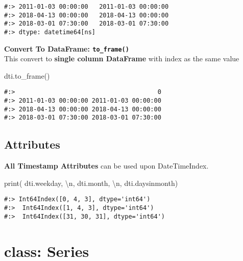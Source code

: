 \documentclass[
]{book}
\newenvironment{Shaded}{\begin{snugshade}}{\end{snugshade}}
\newcommand{\BuiltInTok}[1]{#1}
\newcommand{\CharTok}[1]{\textcolor[rgb]{0.5,0.5,0.5}{#1}}
\newcommand{\NormalTok}[1]{#1}
\newcommand{\StringTok}[1]{\textcolor[rgb]{0.5,0.5,0.5}{#1}}
\begin{document}
\begin{verbatim}
#:> 2011-01-03 00:00:00   2011-01-03 00:00:00
#:> 2018-04-13 00:00:00   2018-04-13 00:00:00
#:> 2018-03-01 07:30:00   2018-03-01 07:30:00
#:> dtype: datetime64[ns]
\end{verbatim}

\textbf{Convert To DataFrame: \texttt{to\_frame()}}\\
This convert to \textbf{single column DataFrame} with index as the same value

\begin{Shaded}
\begin{Highlighting}[]
\NormalTok{dti.to\_frame()}
\end{Highlighting}
\end{Shaded}

\begin{verbatim}
#:>                                       0
#:> 2011-01-03 00:00:00 2011-01-03 00:00:00
#:> 2018-04-13 00:00:00 2018-04-13 00:00:00
#:> 2018-03-01 07:30:00 2018-03-01 07:30:00
\end{verbatim}

\hypertarget{attributes-5}{%
\subsection{Attributes}\label{attributes-5}}

\textbf{All Timestamp Attributes} can be used upon DateTimeIndex.

\begin{Shaded}
\begin{Highlighting}[]
\BuiltInTok{print}\NormalTok{( dti.weekday, }\StringTok{\textquotesingle{}}\CharTok{\textbackslash{}n}\StringTok{\textquotesingle{}}\NormalTok{,}
\NormalTok{       dti.month, }\StringTok{\textquotesingle{}}\CharTok{\textbackslash{}n}\StringTok{\textquotesingle{}}\NormalTok{,}
\NormalTok{       dti.daysinmonth)}
\end{Highlighting}
\end{Shaded}

\begin{verbatim}
#:> Int64Index([0, 4, 3], dtype='int64') 
#:>  Int64Index([1, 4, 3], dtype='int64') 
#:>  Int64Index([31, 30, 31], dtype='int64')
\end{verbatim}

\hypertarget{class-series}{%
\section{class: Series}\label{class-series}}
\end{document}
